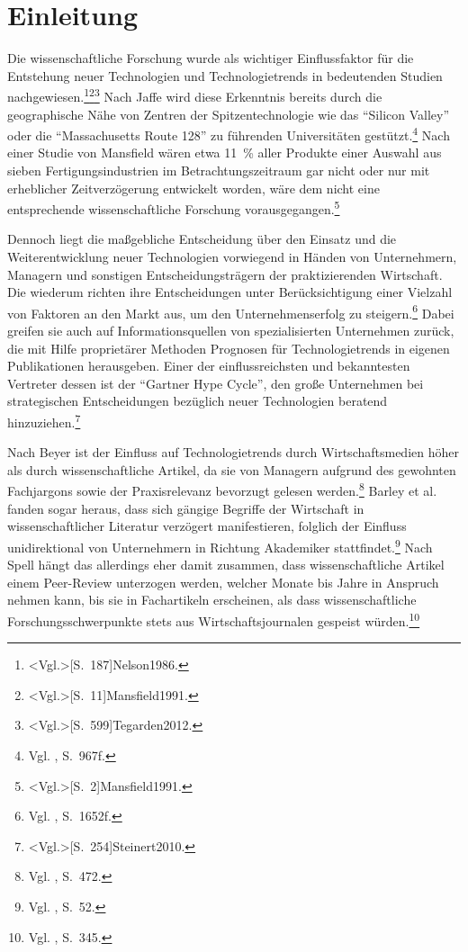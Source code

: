 \section{Einleitung}
Die wissenschaftliche Forschung wurde als wichtiger Einflussfaktor für die Entstehung neuer Technologien und Technologietrends in bedeutenden Studien nachgewiesen.\footnote{\citeNP<Vgl.>[S.~187]{Nelson1986}.}\footnote{\citeNP<Vgl.>[S.~11]{Mansfield1991}.}\footnote{\citeNP<Vgl.>[S.~599]{Tegarden2012}.}
Nach Jaffe wird diese Erkenntnis bereits durch die geographische Nähe von Zentren der Spitzentechnologie wie das "`Silicon Valley"' oder die "`Massachusetts Route 128"' zu führenden Universitäten gestützt.\footnote{Vgl. , S.~967f.} Nach einer Studie von Mansfield wären etwa 11~\% aller Produkte einer Auswahl aus sieben Fertigungsindustrien im Betrachtungszeitraum gar nicht oder nur mit erheblicher Zeitverzögerung entwickelt worden, wäre dem nicht eine entsprechende wissenschaftliche Forschung vorausgegangen.\footnote{\citeNP<Vgl.>[S.~2]{Mansfield1991}.}

Dennoch liegt die maßgebliche Entscheidung über den Einsatz und die Weiterentwicklung neuer Technologien vorwiegend in Händen von Unternehmern, Managern und sonstigen Entscheidungsträgern der praktizierenden Wirtschaft. Die wiederum richten ihre Entscheidungen unter Berücksichtigung einer Vielzahl von Faktoren an den Markt aus, um den Unternehmenserfolg zu steigern.\footnote{Vgl. , S.~1652f.} Dabei greifen sie auch auf Informationsquellen von spezialisierten Unternehmen zurück, die mit Hilfe proprietärer Methoden Prognosen für Technologietrends in eigenen Publikationen herausgeben. Einer der einflussreichsten und bekanntesten Vertreter dessen ist der "`Gartner Hype Cycle"', den große Unternehmen bei strategischen Entscheidungen bezüglich neuer Technologien beratend hinzuziehen.\footnote{\citeNP<Vgl.>[S.~254]{Steinert2010}.}

Nach Beyer ist der Einfluss auf Technologietrends durch Wirtschaftsmedien höher als durch wissenschaftliche Artikel, da sie von Managern aufgrund des gewohnten Fachjargons sowie der Praxisrelevanz bevorzugt gelesen werden.\footnote{Vgl. , S.~472.} Barley et al. fanden sogar heraus, dass sich gängige Begriffe der Wirtschaft in wissenschaftlicher Literatur verzögert manifestieren, folglich der Einfluss unidirektional von Unternehmern in Richtung Akademiker stattfindet.\footnote{Vgl. , S.~52.} Nach Spell hängt das allerdings eher damit zusammen, dass wissenschaftliche Artikel einem Peer-Review unterzogen werden, welcher Monate bis Jahre in Anspruch nehmen kann, bis sie in Fachartikeln erscheinen, als dass wissenschaftliche Forschungsschwerpunkte stets aus Wirtschaftsjournalen gespeist würden.\footnote{Vgl. , S.~345.}

